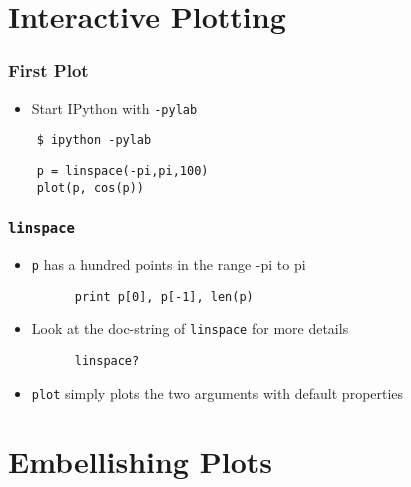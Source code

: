 \section{Interactive Plotting}

\begin{frame}[fragile]
  \frametitle{First Plot}
  \begin{itemize}
  \item Start IPython with \texttt{-pylab}
  \end{itemize}
  \begin{lstlisting}
    $ ipython -pylab
  \end{lstlisting}  %
  \begin{lstlisting}
    p = linspace(-pi,pi,100) 
    plot(p, cos(p))
  \end{lstlisting}
\end{frame}


\begin{frame}[fragile]
  \frametitle{\texttt{linspace}}
  \begin{itemize}
  \item \texttt{p} has a hundred points in the range -pi to pi
    \begin{lstlisting}
      print p[0], p[-1], len(p)
    \end{lstlisting}
  \item Look at the doc-string of \texttt{linspace} for more details
    \begin{lstlisting}
      linspace?
    \end{lstlisting}
  \end{itemize}
  \begin{itemize}
  \item \texttt{plot} simply plots the two arguments with default
    properties 
  \end{itemize}
\end{frame}

\section{Embellishing Plots}

